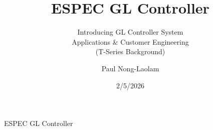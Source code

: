 \documentclass{beamer}
\title{ESPEC GL Controller}
\subtitle{Introducing GL Controller System \\ Applications \& Customer Engineering \\ (T-Series Background)}
\author{Paul Nong-Laolam}%
\institute[ESPEC NA, Inc.] %
{
  ESPEC North America, Inc. \\ 
  4141 Central Parkway \\
  Hudsonville, Michigan 49426 (USA) 
  }
\date{2/5/2026}
\begin{document}
\begin{frame}
  \titlepage
\end{frame}

\begin{frame}{ESPEC GL Controller}
  \tableofcontents
\end{frame}
%


%


\end{document}
